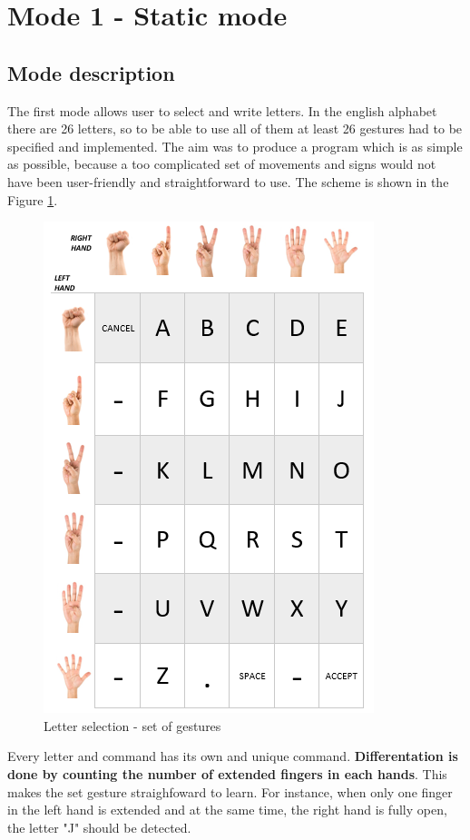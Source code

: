 \section{Mode 1 - Static mode}
\subsection {Mode description}
The first mode allows user to select and write letters. In the english alphabet there are 26 letters, so to be able to use all of them at least 26 gestures had to be specified and implemented. The aim was to produce a program which is as simple as possible, because a too complicated set of movements and signs would not have been user-friendly and straightforward to use. The scheme is shown in the Figure \ref{fig:letters}.

\begin{figure}[H]
	\includegraphics{static_gestures}
	\centering
	\caption{Letter selection - set of gestures}
	\label{fig:letters}
\end{figure}

Every letter and command has its own and unique command. \textbf{Differentation is done by counting the number of extended fingers in each hands}. This makes the set gesture straighfoward to learn. For instance, when only one finger in the left hand is extended and at the same time, the right hand is fully open, the letter "J" should be detected.\\

